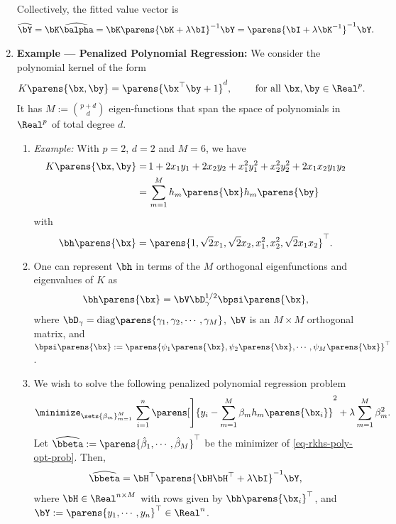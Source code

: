 \documentclass[12pt]{article}
\begin{document}
\begin{enumerate}[label=\textbf{\arabic*.}]
	Collectively, the fitted value vector is 
	\begin{align*}
		\widehat{\bY} = \bK \widehat{\balpha} = \bK \parens{\bK + \lambda \bI}^{-1} \bY = \parens{\bI + \lambda \bK^{-1}}^{-1} \bY. 
	\end{align*}
	
	\item \textbf{Example --- Penalized Polynomial Regression:} We consider the polynomial kernel of the form 
	\begin{align*}
		K \parens{\bx, \by} = \parens{\bx^\top \by + 1}^d, \qquad \text{ for all } \bx, \by \in \Real^p. 
	\end{align*}
	It has $ M := {p+d \choose d} $ eigen-functions that span the space of polynomials in $\Real^p$ of total degree $d$. 
	\begin{enumerate}
		\item \textit{Example:} With $p = 2$, $d = 2$ and $M = 6$, we have 
		\begin{align*}
			K \parens{\bx, \by} = & \, 1 + 2 x_1 y_1 + 2 x_2 y_2 + x^2_1 y_1^2 + x_2^2 y_2^2 + 2 x_1 x_2 y_1 y_2 \\
			= & \, \sum_{m=1}^M h_m \parens{\bx} h_m \parens{\by}
		\end{align*}
		with 
		\begin{equation*}
			\bh \parens{\bx} = \parens{1, \sqrt{2}x_1, \sqrt{2}x_2, x_1^2, x_2^2, \sqrt{2}x_1x_2}^\top. 
		\end{equation*}
		
		\item One can represent $\bh$ in terms of the $M$ orthogonal eigenfunctions and eigenvalues of $K$ as 
		\begin{align*}
			\bh \parens{\bx} = \bV \bD_\gamma^{1/2} \bpsi \parens{\bx}, 
		\end{align*}
		where $\bD_\gamma = \mathrm{diag} \parens{\gamma_1, \gamma_2, \cdots, \gamma_M}$, $\bV$ is an $M \times M$ orthogonal matrix, and $\bpsi \parens{\bx} := \parens{\psi_1 \parens{\bx}, \psi_2 \parens{\bx}, \cdots, \psi_M \parens{\bx} }^\top$. 
		
		\item We wish to solve the following penalized polynomial regression problem 
		\begin{align}\label{eq-rkhs-poly-opt-prob}
			\minimize_{\sets{\beta_m}_{m=1}^M} \, \sum_{i=1}^n \parens[\Bigg]{y_i - \sum_{m=1}^M \beta_m h_m \parens{\bx_i}}^2 + \lambda \sum_{m=1}^M \beta_m^2. 
		\end{align}
		Let $\widehat{\bbeta} := \parens{\hat{\beta}_1, \cdots, \hat{\beta}_M}^\top$ be the minimizer of \eqref{eq-rkhs-poly-opt-prob}. Then, 
		\begin{align*}
			\widehat{\bbeta} = \bH^\top \parens{\bH \bH^\top + \lambda \bI}^{-1} \bY, 
		\end{align*}
		where $\bH \in \Real^{n \times M}$ with rows given by $\bh \parens{\bx_i}^\top$, and $\bY := \parens{y_1, \cdots, y_n}^\top \in \Real^n$. 
				

\end{enumerate}
\end{enumerate}
\end{document}

